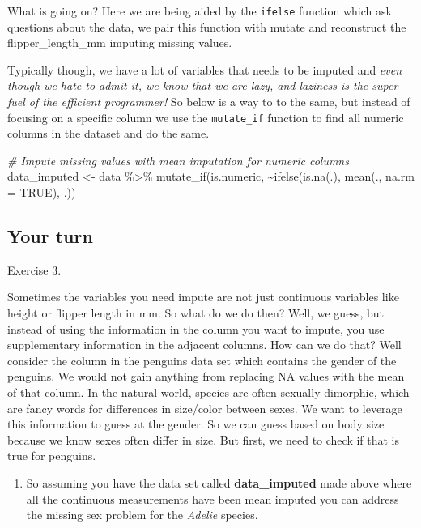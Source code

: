 \documentclass[
]{book}
\newenvironment{Shaded}{\begin{snugshade}}{\end{snugshade}}
\newcommand{\AttributeTok}[1]{\textcolor[rgb]{0.77,0.63,0.00}{#1}}
\newcommand{\CommentTok}[1]{\textcolor[rgb]{0.56,0.35,0.01}{\textit{#1}}}
\newcommand{\ConstantTok}[1]{\textcolor[rgb]{0.00,0.00,0.00}{#1}}
\newcommand{\FunctionTok}[1]{\textcolor[rgb]{0.00,0.00,0.00}{#1}}
\newcommand{\NormalTok}[1]{#1}
\newcommand{\OtherTok}[1]{\textcolor[rgb]{0.56,0.35,0.01}{#1}}
\newcommand{\SpecialCharTok}[1]{\textcolor[rgb]{0.00,0.00,0.00}{#1}}
\providecommand{\tightlist}{%
  \setlength{\itemsep}{0pt}\setlength{\parskip}{0pt}}
\begin{document}
What is going on? Here we are being aided by the \texttt{ifelse}
function which ask questions about the data, we pair this function with
mutate and reconstruct the flipper\_length\_mm imputing missing values.

Typically though, we have a lot of variables that needs to be imputed
and \emph{even though we hate to admit it, we know that we are lazy, and
laziness is the super fuel of the efficient programmer!} So below is a
way to to the same, but instead of focusing on a specific column we use
the \texttt{mutate\_if} function to find all numeric columns in the
dataset and do the same.

\begin{Shaded}
\begin{Highlighting}[]
  \CommentTok{\# Impute missing values with mean imputation for numeric columns}
\NormalTok{  data\_imputed }\OtherTok{\textless{}{-}}\NormalTok{ data }\SpecialCharTok{\%\textgreater{}\%}
    \FunctionTok{mutate\_if}\NormalTok{(is.numeric, }\SpecialCharTok{\textasciitilde{}}\FunctionTok{ifelse}\NormalTok{(}\FunctionTok{is.na}\NormalTok{(.), }\FunctionTok{mean}\NormalTok{(., }\AttributeTok{na.rm =} \ConstantTok{TRUE}\NormalTok{), .))}
\end{Highlighting}
\end{Shaded}

\hypertarget{your-turn}{%
\subsection{Your turn}\label{your-turn}}

Exercise 3.

Sometimes the variables you need impute are not just continuous
variables like height or flipper length in mm. So what do we do then?
Well, we guess, but instead of using the information in the column you
want to impute, you use supplementary information in the adjacent
columns. How can we do that? Well consider the column in the penguins
data set which contains the gender of the penguins. We would not gain
anything from replacing NA values with the mean of that column. In the
natural world, species are often sexually dimorphic, which are fancy
words for differences in size/color between sexes. We want to leverage
this information to guess at the gender. So we can guess based on body
size because we know sexes often differ in size. But first, we need to
check if that is true for penguins.

\begin{enumerate}
\def\labelenumi{\arabic{enumi}.}
\tightlist
\item
  So assuming you have the data set called \textbf{data\_imputed} made
  above where all the continuous measurements have been mean imputed you
  can address the missing sex problem for the \emph{Adelie} species.
\end{enumerate}
\end{document}
